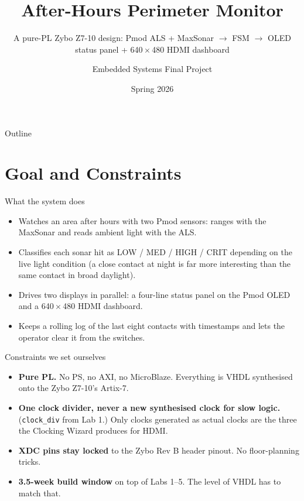 \documentclass[aspectratio=169,10pt]{beamer}
\title{After-Hours Perimeter Monitor}
\subtitle{A pure-PL Zybo Z7-10 design: Pmod ALS + MaxSonar $\rightarrow$ FSM
$\rightarrow$ OLED status panel + 640\,$\times$\,480 HDMI dashboard}
\author{Embedded Systems Final Project}
\institute{ECE Upper-Division / Graduate Combined Course}
\date{Spring 2026}
\begin{document}
\begin{frame}
    \titlepage
\end{frame}

\begin{frame}{Outline}
    \tableofcontents
\end{frame}

\section{Goal and Constraints}

\begin{frame}{What the system does}
    \begin{itemize}
        \item Watches an area after hours with two Pmod sensors:
              ranges with the MaxSonar and reads ambient light with the
              ALS.
        \item Classifies each sonar hit as LOW / MED / HIGH / CRIT
              depending on the live light condition (a close contact at
              night is far more interesting than the same contact in
              broad daylight).
        \item Drives two displays in parallel: a four-line status panel
              on the Pmod OLED and a 640\,$\times$\,480 HDMI dashboard.
        \item Keeps a rolling log of the last eight contacts with
              timestamps and lets the operator clear it from the
              switches.
    \end{itemize}
\end{frame}

\begin{frame}{Constraints we set ourselves}
    \begin{itemize}
        \item \textbf{Pure PL.} No PS, no AXI, no MicroBlaze. Everything
              is VHDL synthesised onto the Zybo Z7-10's Artix-7.
        \item \textbf{One clock divider, never a new synthesised clock
              for slow logic.} (\texttt{clock\_div} from Lab 1.) Only
              clocks generated as actual clocks are the three the
              Clocking Wizard produces for HDMI.
        \item \textbf{XDC pins stay locked} to the Zybo Rev B header
              pinout. No floor-planning tricks.
        \item \textbf{3.5-week build window} on top of Labs 1--5. The
              level of VHDL has to match that.
    \end{itemize}
\end{frame}
\end{document}
